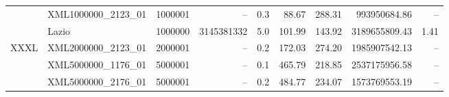 \begin{table}[t]
\begin{tabular}{clrrrrrrr}
 & XML1000000\_2123\_01 & 1000001 & -- & 0.3 & 88.67 & 288.31 & 993950684.86 & -- \\
 & Lazio & 1000000 & 3145381332 & 5.0 & 101.99 & 143.92 & 3189655809.43 & 1.41\\
\midrule
\multirow{3}{*}{XXXL}
 & XML2000000\_2123\_01 & 2000001 & -- & 0.2 & 172.03 & 274.20 & 1985907542.13 & -- \\
 & XML5000000\_1176\_01 & 5000001 & -- & 0.1 & 465.79 & 218.85 & 2537175956.58 & -- \\
 & XML5000000\_2176\_01 & 5000001 & -- & 0.2 & 484.77 & 234.07 & 1573769553.19 & -- \\
\bottomrule
\end{tabular}

\label{tab:bpmds_per_instance_results}
\end{table}
